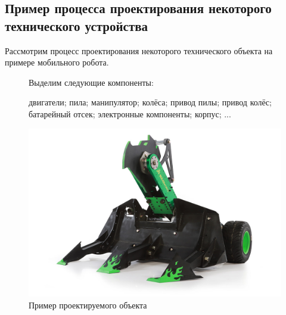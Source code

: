 ﻿%
\subsection{Пример процесса проектирования некоторого технического устройства}
\begin{frame}%

Рассмотрим процесс проектирования некоторого технического объекта на примере мобильного робота.
\begin{figure}[!ht]
  \begin{minipage}{0.455\linewidth}
    Выделим следующие компоненты:
    \begin{itemize}
      \arrowitem двигатели;
      \arrowitem пила;
      \arrowitem манипулятор;
      \arrowitem колёса;
      \arrowitem привод пилы;
      \arrowitem привод колёс;
      \arrowitem батарейный отсек;
      \arrowitem электронные компоненты;
      \arrowitem корпус;
      \arrowitem ...
    \end{itemize}
  \end{minipage}%
  \begin{minipage}{0.455\linewidth}
    \centering
    \includegraphics[width=\textwidth]{images/robot.jpg}
    \caption{Пример проектируемого объекта}
    \label{fig:technicalObjectExample}
  \end{minipage}
\end{figure}


\end{frame}
